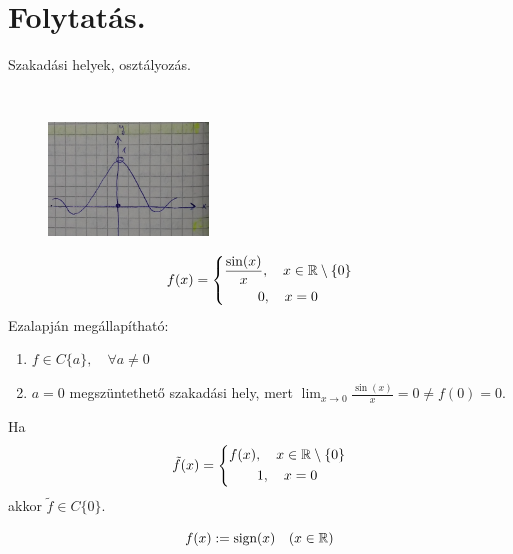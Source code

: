 \documentclass[a4paper,11.5pt]{article}
\begin{document}
	\section{Folytatás.}
	\begin{revision}
		Szakadási helyek, osztályozás.
		\begin{example}\
			
			\begin{figure}[H]
				\centering
				\includegraphics[height=3cm]{kepek/03ea_1.jpg}
				\caption{}\label{}
			\end{figure}
			\[ f(x) = \left\{\begin{gathered}
			\frac{\sin(x)}{x}, \quad x\in\mathbb{R}\setminus\{0\}\\
			0, \quad x=0
			\end{gathered}\right.\]
			Ezalapján megállapítható:
			\begin{enumerate}
				\item $f\in C\{a\}, \quad \forall a \not=0$
				\item $a=0$ megszüntethető szakadási hely, mert $\displaystyle \lim_{x\to0}\frac{\sin(x)}{x} = 0 \not=f(0)=0.$
			\end{enumerate}
			Ha 
			\[ \tilde{f}(x) = \left\{\begin{gathered}
			f(x), \quad x\in\mathbb{R}\setminus\{0\}\\
			1, \quad x=0
			\end{gathered}\right. \]
			akkor $\tilde{f}\in C\{0\}$.
			
		\end{example}
		\begin{example}
			\[ f(x):=\text{sign}(x)\quad (x\in\mathbb{R}) \]
			

\end{example}
\end{revision}
\end{document}
